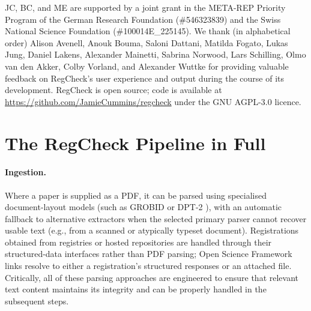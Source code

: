 \documentclass{article}
\begin{document}
\begin{ack}
JC, BC, and ME are supported by a joint grant in the META-REP Priority Program
of the German Research Foundation (\#546323839) and the Swiss National Science
Foundation (\#100014E\_225145). We thank (in alphabetical order) Alison Avenell,
Anouk Bouma, Saloni Dattani, Matilda Fogato, Lukas Jung, Daniel Lakens,
Alexander Mainetti, Sabrina Norwood, Lars Schilling, Olmo van den Akker, Colby
Vorland, and Alexander Wuttke for providing valuable feedback on RegCheck's user
experience and output during the course of its development. RegCheck is open
source; code is available at
\url{https://github.com/JamieCummins/regcheck} under the GNU AGPL-3.0 licence.
\end{ack}



\appendix
\newpage

\section{The RegCheck Pipeline in Full}\label{app:pipeline}

\paragraph{Ingestion.} Where a paper is supplied as a PDF, it can be parsed
using specialised document-layout models (such as GROBID
\citep{grobid_grobid_2025} or DPT-2 \citep{huang_document_2025}), with an
automatic fallback to alternative extractors when the selected primary parser
cannot recover usable text (e.g., from a scanned or atypically typeset
document). Registrations obtained from registries or hosted repositories are
handled through their structured-data interfaces rather than PDF parsing;
Open Science Framework links resolve to either a registration's structured
responses or an attached file. Critically, all of these parsing approaches are
engineered to ensure that relevant text content maintains its integrity and can
be properly handled in the subsequent steps.
\end{document}
